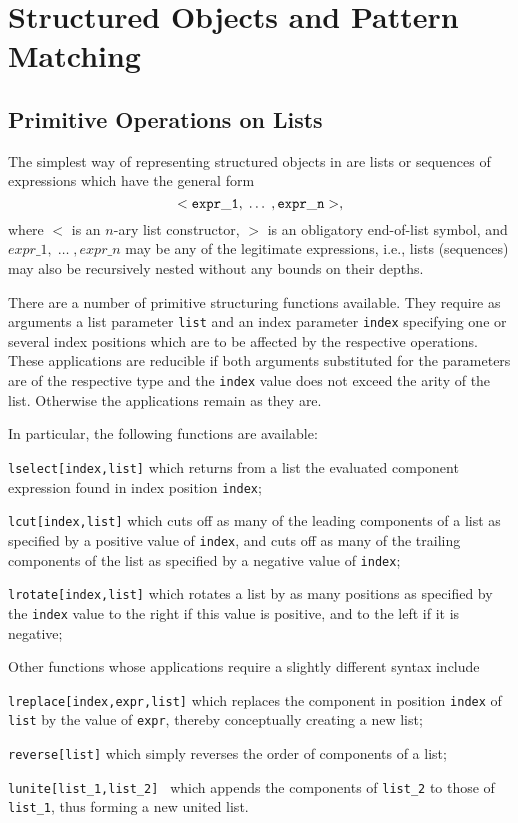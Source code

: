 \section{Structured Objects and Pattern Matching}
\subsection{Primitive Operations on Lists}
The simplest way of representing structured objects in \kir are {\mys lists} or {\mys sequences}
of expressions which have the general form
$$
{\tt <expr\_1,\;\ldots\;,expr\_n>},
$$
where $<$ is an $n$-ary {\mys list constructor}, $>$ is an obligatory {\mys end-of-list symbol},
and $expr\_1,\;\ldots\;,expr\_n$ may be any of the legitimate \kir expressions, i.e.,
lists (sequences) may also be recursively nested without any bounds on their depths.

There are a number of primitive {\mys structuring functions} available. They
require as arguments a list parameter {\tt list} and an index parameter {\tt index} 
specifying one or several index positions
which are to be affected by the respective operations. 
These applications are reducible if both arguments substituted for the parameters 
are of the respective type and the
{\tt index} value does not exceed the arity of the list. Otherwise the applications remain as
they are.

In particular, the following functions are available:
\begin{description}
\item{\tt lselect[index,list]} which returns from a list the evaluated component
expression found in index position {\tt index};
\item{\tt lcut[index,list]} which cuts off as many of the leading components of a list as
specified by a positive value of {\tt index}, and cuts off as many of the trailing components
of the list as specified by a negative value of {\tt index};
\item{\tt lrotate[index,list]} which rotates a list by as many positions as
 specified by the {\tt index} value
to the right if this value is positive, and to the left if it is negative;
\end{description}

Other functions whose applications require a slightly different syntax include
\begin{description}
\item {\tt lreplace[index,expr,list]} which replaces the component in position {\tt index}
of {\tt list} by the value of {\tt expr}, thereby conceptually creating a new list;
\item{\tt reverse[list]} which simply reverses the order of components of a list;
\item{\tt lunite[list\_1,list\_2] } which appends the components of {\tt list\_2}
to those of {\tt list\_1}, thus forming a new united list.
\end{description}

